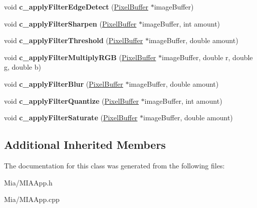 \begin{DoxyCompactItemize}
\item 
\hypertarget{classMIAApp_a9aff452f82c0424fed376c42b2a0050d}{void {\bfseries c\-\_\-apply\-Filter\-Edge\-Detect} (\hyperlink{classPixelBuffer}{Pixel\-Buffer} $\ast$image\-Buffer)}\label{classMIAApp_a9aff452f82c0424fed376c42b2a0050d}

\item 
\hypertarget{classMIAApp_a1387d73f2008fb03754e86e3387907af}{void {\bfseries c\-\_\-apply\-Filter\-Sharpen} (\hyperlink{classPixelBuffer}{Pixel\-Buffer} $\ast$image\-Buffer, int amount)}\label{classMIAApp_a1387d73f2008fb03754e86e3387907af}

\item 
\hypertarget{classMIAApp_aac44a6e3b5d22189642b67ae80a30177}{void {\bfseries c\-\_\-apply\-Filter\-Threshold} (\hyperlink{classPixelBuffer}{Pixel\-Buffer} $\ast$image\-Buffer, double amount)}\label{classMIAApp_aac44a6e3b5d22189642b67ae80a30177}

\item 
\hypertarget{classMIAApp_adcbc6918fea92495eb6b821024c27098}{void {\bfseries c\-\_\-apply\-Filter\-Multiply\-R\-G\-B} (\hyperlink{classPixelBuffer}{Pixel\-Buffer} $\ast$image\-Buffer, double r, double g, double b)}\label{classMIAApp_adcbc6918fea92495eb6b821024c27098}

\item 
\hypertarget{classMIAApp_a4931718cd5aab02119fb4b6cf19783ef}{void {\bfseries c\-\_\-apply\-Filter\-Blur} (\hyperlink{classPixelBuffer}{Pixel\-Buffer} $\ast$image\-Buffer, double amount)}\label{classMIAApp_a4931718cd5aab02119fb4b6cf19783ef}

\item 
\hypertarget{classMIAApp_a5fae1cc6b19a5e7d7cc9e8d4c2563ab0}{void {\bfseries c\-\_\-apply\-Filter\-Quantize} (\hyperlink{classPixelBuffer}{Pixel\-Buffer} $\ast$image\-Buffer, int amount)}\label{classMIAApp_a5fae1cc6b19a5e7d7cc9e8d4c2563ab0}

\item 
\hypertarget{classMIAApp_a4824dcf47e314ab7bf5e26c669b07c8b}{void {\bfseries c\-\_\-apply\-Filter\-Saturate} (\hyperlink{classPixelBuffer}{Pixel\-Buffer} $\ast$image\-Buffer, double amount)}\label{classMIAApp_a4824dcf47e314ab7bf5e26c669b07c8b}

\end{DoxyCompactItemize}
\subsection*{Additional Inherited Members}


The documentation for this class was generated from the following files\-:\begin{DoxyCompactItemize}
\item 
Mia/M\-I\-A\-App.\-h\item 
Mia/M\-I\-A\-App.\-cpp\end{DoxyCompactItemize}
